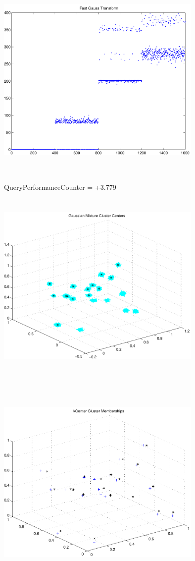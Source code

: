 \documentclass[9pt]{article}
\theoremstyle{plain}
\theoremstyle{definition}
\theoremstyle{remark}
\numberwithin{equation}{section}
\begin{document}
\includegraphics[width=10.0cm,height=10.0cm]{FGT4_Centers.pdf}

QueryPerformanceCounter  =  +3.779
\includegraphics[width=10.0cm,height=10.0cm]{GaussianMixture_ClusterCenters20_Centers.pdf}

\includegraphics[width=10.0cm,height=10.0cm]{KCenterClusterMemberships_20_Centers.pdf}
\end{document}
